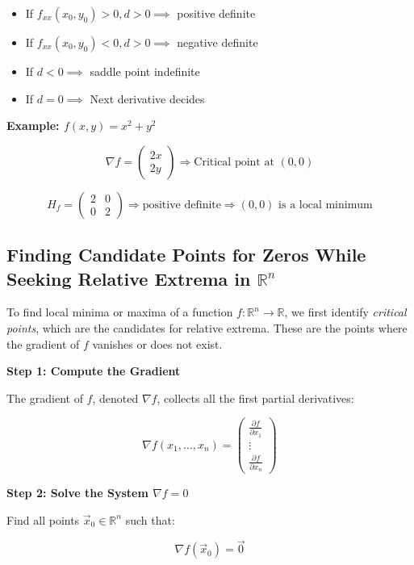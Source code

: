 \begin{itemize}[label=\(-\)]
    \item If \(f_{xx}(x_0, y_0) > 0, d > 0 \implies\) positive definite
    \item If \(f_{xx}(x_0, y_0) < 0, d > 0 \implies\) negative definite
    \item If \(d < 0 \implies \) saddle point indefinite
    \item If \(d = 0 \implies \) Next derivative decides
\end{itemize}

\textbf{Example: \( f(x, y) = x^2 + y^2 \)}

\[
\nabla f = \begin{pmatrix} 2x \\ 2y \end{pmatrix} \Rightarrow \text{Critical point at } (0, 0)
\]

\[
H_f = \begin{pmatrix} 2 & 0 \\ 0 & 2 \end{pmatrix} \Rightarrow \text{positive definite}
\Rightarrow (0, 0) \text{ is a local minimum}
\]

\subsection{Finding Candidate Points for Zeros While Seeking Relative Extrema in \( \mathbb{R}^n \)}

To find local minima or maxima of a function \( f : \mathbb{R}^n \to \mathbb{R} \), we first identify 
\emph{critical points}, which are the candidates for relative extrema. 
These are the points where the gradient of \( f \) vanishes or does not exist.

\textbf{Step 1: Compute the Gradient}

The gradient of \( f \), denoted \( \nabla f \), collects all the first partial derivatives:

\[
\nabla f(x_1, \dots, x_n) =
\begin{pmatrix}
\frac{\partial f}{\partial x_1} \\
\vdots \\
\frac{\partial f}{\partial x_n}
\end{pmatrix}
\]

\textbf{Step 2: Solve the System \( \nabla f = 0 \)}

Find all points \( \vec{x}_0 \in \mathbb{R}^n \) such that:

\[
\nabla f(\vec{x}_0) = \vec{0}
\]

